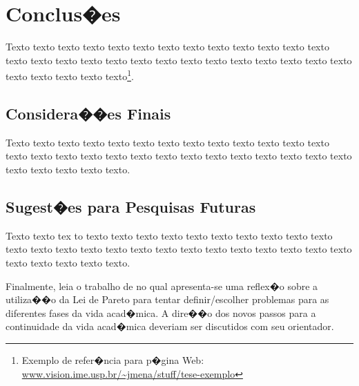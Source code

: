 \chapter{Conclus�es}
\label{cap:conclusoes}

Texto texto texto texto texto texto texto texto texto texto texto texto texto
texto texto texto texto texto texto texto texto texto texto texto texto texto
texto texto texto texto texto texto\footnote{Exemplo de refer�ncia para p�gina
Web: \url{www.vision.ime.usp.br/~jmena/stuff/tese-exemplo}}.

\section{Considera��es Finais} 

Texto texto texto texto texto texto texto texto texto texto texto texto texto
texto texto texto texto texto texto texto texto texto texto texto texto texto
texto texto texto texto texto texto. 

\section{Sugest�es para Pesquisas Futuras} 

Texto texto tex      to texto texto texto texto texto texto texto texto texto texto
texto texto texto texto texto texto texto texto texto texto texto texto texto
texto texto texto texto texto texto.

Finalmente, leia o trabalho de \citet{alon09:how} no qual apresenta-se
uma reflex�o sobre a utiliza��o da Lei de Pareto para tentar definir/escolher
problemas para as diferentes fases da vida acad�mica.  A dire��o dos novos
passos para a continuidade da vida acad�mica deveriam ser discutidos com seu
orientador.

